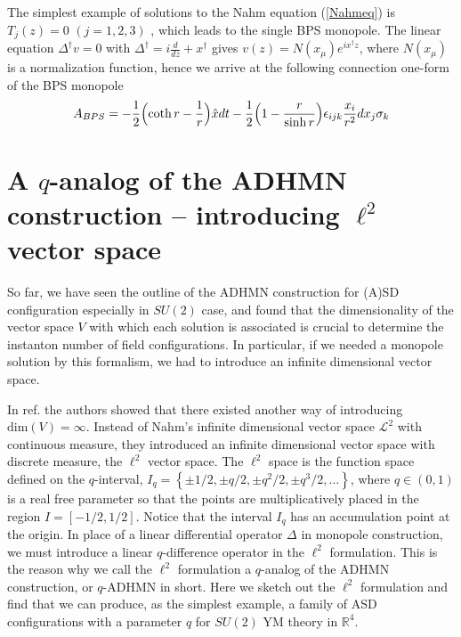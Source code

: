 \documentclass[a4paper,10pt]{article}
\newcommand{\sutwo}{$SU(2)$ }
\begin{document}
The simplest example of solutions to the Nahm equation (\ref{Nahmeq}) is $T_j(z)=0 \,\, (j=1,2,3)$ \cite{Nahm82}, which leads to the single BPS monopole.
 The linear equation $\Delta^\dagger v=0$ with $\Delta^\dagger=i\frac{d}{dz}+x^\dagger$ gives $v(z)=N(x_\mu)e^{ix^\dagger z}$, where $N(x_\mu)$ is a normalization function, hence we arrive at the following connection one-form of the BPS monopole
\begin{equation}
A_{BPS}=-\frac{1}{2}\Bigl(\coth r-\frac{1}{r}\Bigr)\hat{x}dt-\frac{1}{2}\Bigl(1-\frac{r}{\sinh r}\Bigr)\epsilon_{ijk}\frac{x_i}{r^2}dx_j\sigma_k\label{A_BPS}
\end{equation}

\section{A  $q$-analog of the ADHMN construction -- introducing $\ell^2$ vector space}
So far, we have seen the outline of the ADHMN construction for (A)SD configuration especially in \sutwo case, and found that the dimensionality of the vector space $V$ with which each solution is associated is crucial to determine the instanton number of field configurations.
In particular, if we needed a monopole solution by this formalism, we had to introduce an infinite dimensional vector space.


In ref.\cite{KN} the authors showed that there existed another way of introducing $\mbox{dim}(V)=\infty$.
Instead of Nahm's infinite dimensional vector space $\mathcal{L}^2$ with continuous measure, they introduced an infinite dimensional vector space with discrete measure, the $\ell^2$ vector space.
The $\ell^2$ space is the function space defined on the $q$-interval, $I_q=\left\{\pm1/2,\pm q/2,\pm q^2/2,\pm q^3/2,\dots\right\}$, where $q \in (0,1)$ is a real free parameter so that the points are multiplicatively placed in the region $I=[-1/2,1/2]$.
Notice that the interval $I_q$ has an accumulation point at the origin. 
In place of a linear differential operator $\Delta$ in monopole construction, we must introduce a linear $q$-difference operator in the $\ell^2$ formulation.
This is the reason why we call the $\ell^2$ formulation a $q$-analog of the ADHMN construction, or $q$-ADHMN in short.
Here we sketch out the $\ell^2$ formulation and find that we can produce, as the simplest example, a family of ASD configurations with a parameter $q$ for \sutwo YM theory in $\mathbb{R}^4$.
\end{document}
